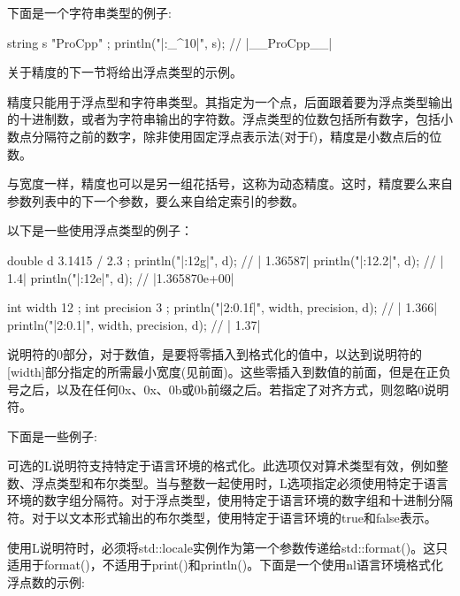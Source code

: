 下面是一个字符串类型的例子:

\begin{cpp}
string s { "ProCpp" };
println("|{:_^10}|", s); // |__ProCpp__|
\end{cpp}

关于精度的下一节将给出浮点类型的示例。


精度只能用于浮点型和字符串类型。其指定为一个点，后面跟着要为浮点类型输出的十进制数，或者为字符串输出的字符数。浮点类型的位数包括所有数字，包括小数点分隔符之前的数字，除非使用固定浮点表示法(对于f)，精度是小数点后的位数。

与宽度一样，精度也可以是另一组花括号，这称为动态精度。这时，精度要么来自参数列表中的下一个参数，要么来自给定索引的参数。

以下是一些使用浮点类型的例子：

\begin{cpp}
double d { 3.1415 / 2.3 };
println("|{:12g}|", d);   // |     1.36587|
println("|{:12.2}|", d);  // |         1.4|
println("|{:12e}|", d);   // |1.365870e+00|

int width { 12 };
int precision { 3 };
println("|{2:{0}.{1}f}|", width, precision, d); // |     1.366|
println("|{2:{0}.{1}}|", width, precision, d);  // |      1.37|
\end{cpp}


说明符的0部分，对于数值，是要将零插入到格式化的值中，以达到说明符的[width]部分指定的所需最小宽度(见前面)。这些零插入到数值的前面，但是在正负号之后，以及在任何0x、0x、0b或0b前缀之后。若指定了对齐方式，则忽略0说明符。

下面是一些例子:



可选的L说明符支持特定于语言环境的格式化。此选项仅对算术类型有效，例如整数、浮点类型和布尔类型。当与整数一起使用时，L选项指定必须使用特定于语言环境的数字组分隔符。对于浮点类型，使用特定于语言环境的数字组和十进制分隔符。对于以文本形式输出的布尔类型，使用特定于语言环境的true和false表示。

使用L说明符时，必须将std::locale实例作为第一个参数传递给std::format()。这只适用于format()，不适用于print()和println()。下面是一个使用nl语言环境格式化浮点数的示例:

